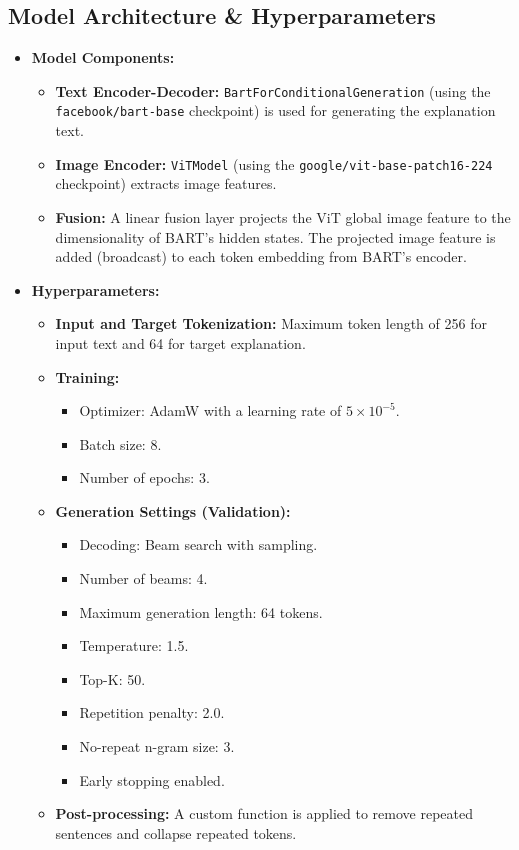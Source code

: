 \documentclass{article}
\begin{document}
\subsection{Model Architecture \& Hyperparameters}
\begin{itemize}
    \item \textbf{Model Components:}
    \begin{itemize}
        \item \textbf{Text Encoder-Decoder:} \texttt{BartForConditionalGeneration} (using the \texttt{facebook/bart-base} checkpoint) is used for generating the explanation text.
        \item \textbf{Image Encoder:} \texttt{ViTModel} (using the \texttt{google/vit-base-patch16-224} checkpoint) extracts image features.
        \item \textbf{Fusion:} A linear fusion layer projects the ViT global image feature to the dimensionality of BART’s hidden states. The projected image feature is added (broadcast) to each token embedding from BART's encoder.
    \end{itemize}
    \item \textbf{Hyperparameters:}
    \begin{itemize}
        \item \textbf{Input and Target Tokenization:} Maximum token length of 256 for input text and 64 for target explanation.
        \item \textbf{Training:} 
            \begin{itemize}
                \item Optimizer: AdamW with a learning rate of \(5 \times 10^{-5}\).
                \item Batch size: 8.
                \item Number of epochs: 3.
            \end{itemize}
        \item \textbf{Generation Settings (Validation):}
            \begin{itemize}
                \item Decoding: Beam search with sampling.
                \item Number of beams: 4.
                \item Maximum generation length: 64 tokens.
                \item Temperature: 1.5.
                \item Top-K: 50.
                \item Repetition penalty: 2.0.
                \item No-repeat n-gram size: 3.
                \item Early stopping enabled.
            \end{itemize}
        \item \textbf{Post-processing:} A custom function is applied to remove repeated sentences and collapse repeated tokens.
    \end{itemize}
\end{itemize}
\end{document}
